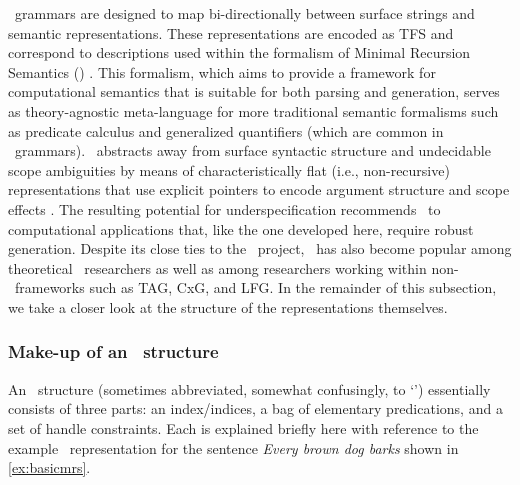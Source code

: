 \delphin\ grammars are designed to map bi-directionally between surface strings
and semantic representations. These representations are encoded as TFS and
correspond to descriptions used within the formalism of Minimal Recursion
Semantics (\mrs) \citep{copestake2005minimal}. This formalism, which aims to
provide a framework for computational semantics that is suitable for both
parsing and generation, serves as theory-agnostic meta-language for more
traditional semantic formalisms such as predicate calculus and generalized
quantifiers (which are common in \delphin\ grammars). \mrs\ abstracts away from
surface syntactic structure and undecidable scope ambiguities by means of
characteristically flat (i.e., non-recursive) representations that use explicit
pointers to encode argument structure and scope effects
\citep{copestake2000open}. The resulting potential for underspecification
recommends \mrs\ to computational applications that, like the one developed
here, require robust generation. Despite its close ties to the \delphin\
project, \mrs\ has also become popular among theoretical \hpsg\ researchers as
well as among researchers working within non-\hpsg\ frameworks such as TAG,
CxG, and LFG. In the remainder of this subsection, we take a closer look at the structure of the representations themselves.

\subsubsection{Make-up of an \mrs\ structure}

An \mrs\ structure (sometimes abbreviated, somewhat confusingly, to `\mrs')
essentially consists of three parts: an index/indices, a bag of elementary
predications, and a set of handle constraints. Each is explained briefly here
with reference to the example \mrs\ representation for the sentence \emph{Every
brown dog barks} shown in \cref{ex:basicmrs}.


